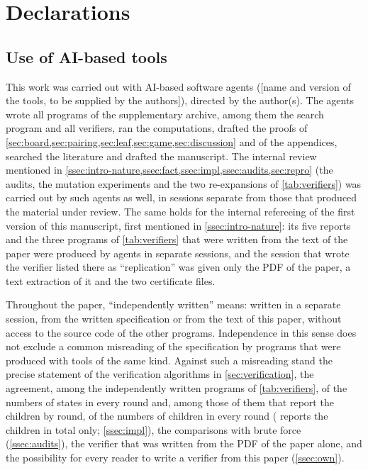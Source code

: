 \section*{Declarations}

\subsection*{Use of AI-based tools}
This work was carried out with AI-based software agents
([name and version of the tools, to be supplied by the authors]),
directed by the author(s). The agents wrote all programs of the supplementary archive,
among them the search program and all verifiers, ran the computations, drafted the proofs of
\cref{sec:board,sec:pairing,sec:leaf,sec:game,sec:discussion} and of the appendices, searched the
literature and drafted the manuscript. The internal review mentioned in
\cref{ssec:intro-nature,ssec:fact,ssec:impl,ssec:audits,sec:repro} (the audits, the mutation experiments
and the two re-expansions of \cref{tab:verifiers}) was carried out by such agents as well, in sessions
separate from those that produced the material under review. The same holds for the internal refereeing
of the first version of this manuscript, first mentioned in \cref{ssec:intro-nature}: its five reports and the three programs of
\cref{tab:verifiers} that were written from the text of the paper were produced by agents in separate
sessions, and the session that wrote the verifier listed there as ``replication'' was given only the PDF
of the paper, a text extraction of it and the two certificate files.

Throughout the paper, ``independently written'' means: written in a separate session, from the written
specification or from the text of this paper, without access to the source code of the other programs.
Independence in this sense does not exclude a common misreading of the specification by programs that
were produced with tools of the same kind. Against such a misreading stand the precise statement of the
verification algorithms in \cref{sec:verification}, the agreement, among the independently written programs of \cref{tab:verifiers}, of the numbers of
states in every round and, among those of them that report the children by round, of the numbers of
children in every round ( reports the children in total only; \cref{ssec:impl}),
the comparisons with brute force (\cref{ssec:audits}), the verifier
that was written from the PDF of the paper alone, and the possibility for every reader to write a
verifier from this paper (\cref{ssec:own}).

